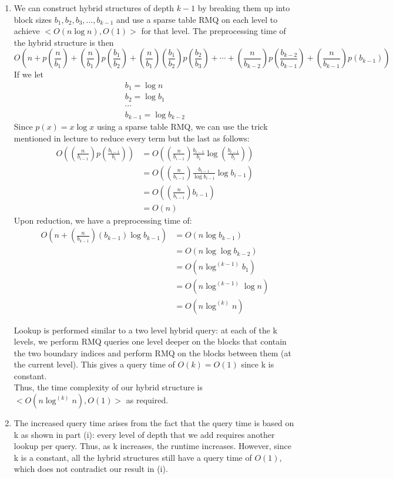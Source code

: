 \documentclass[11pt,oneside,a4paper]{article}
\begin{document}
\begin{description}
\begin{enumerate}[label=\roman*]
\item We can construct hybrid structures of depth $k-1$ by breaking them up into block sizes $b_1, b_2, b_3, \ldots, b_{k-1}$ and use a sparse table RMQ on each level to achieve $<O(n\log n),O(1)>$ for that level. The preprocessing time of the hybrid structure is then \[
    O(n + p(\frac{n}{b_1}) + (\frac{n}{b_1}) p(\frac{b_1}{b_2}) + (\frac{n}{b_1})(\frac{b_1}{b_2}) p(\frac{b_2}{b_3}) + \cdots + (\frac{n}{b_{k-2}}) p(\frac{b_{k-2}}{b_{k-1}}) + (\frac{n}{b_{k-1}}) p(b_{k-1}))
\] If we let \begin{align*}
               b_1=\log n \\
               b_2=\log b_1 \\
               \cdots \\
               b_{k-1} = \log b_{k-2}
             \end{align*}
Since $p(x)=x\log x$ using a sparse table RMQ, we can use the trick mentioned in lecture to reduce every term but the last as follows: \begin{align*}
  O((\frac{n}{b_{i-1}})p(\frac{b_{i-1}}{b_i})) &= O((\frac{n}{b_{i-1}})\frac{b_{i-1}}{b_i}\log(\frac{b_{i-1}}{b_i})) \\ &= O((\frac{n}{b_{i-1}})\frac{b_{i-1}}{\log b_{i-1}}\log b_{i-1}) \\ &= O((\frac{n}{b_{i-1}})b_{i-1}) \\ &= O(n)
\end{align*}
Upon reduction, we have a preprocessing time of: \begin{align*}
                           O(n + (\frac{n}{b_{k-1}}) (b_{k-1})\log b_{k-1}) &= O(n\log b_{k-1}) \\ &= O(n\log \log b_{k-2}) \\ &= O(n\log^{(k-1)} b_1) \\ &= O(n\log^{(k-1)} \log n) \\ &= O(n\log^{(k)} n)
                         \end{align*}

Lookup is performed similar to a two level hybrid query: at each of the k levels, we perform RMQ queries one level deeper on the blocks that contain the two boundary indices and perform RMQ on the blocks between them (at the current level). This gives a query time of $O(k) = O(1)$ since k is constant. \\

Thus, the time complexity of our hybrid structure is $<O(n\log^{(k)}n), O(1)>$ as required.

\item The increased query time arises from the fact that the query time is based on k as shown in part (i): every level of depth that we add requires another lookup per query. Thus, as k increases, the runtime increases. However, since k is a constant, all the hybrid structures still have a query time of $O(1)$, which does not contradict our result in (i).

\end{enumerate}

\end{description}
\end{document}
